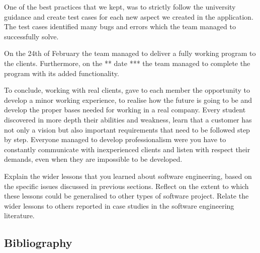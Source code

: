 \documentclass{l3proj}
\begin{document}
One of the best practices that we kept, was to strictly follow the university guidance and create test cases for each new aspect we created in the application. The test cases identified many bugs and errors which the team managed to successfully solve.


On the 24th of February the team managed to deliver a fully working program to the clients. Furthermore, on the ** date *** the team managed to complete the program with its added functionality.

To conclude, working with real clients, gave to each member the opportunity to develop a minor working experience, to realise how the future is going to be and develop the proper bases needed for working in a real company. Every student discovered in more depth their abilities and weakness, learn that a customer has not only a vision but also important requirements that need to be followed step by step. Everyone managed to develop professionalism were you have to constantly communicate with inexperienced clients and listen with respect their demands, even when they are impossible to be developed.









Explain the wider lessons that you learned about software engineering,
based on the specific issues discussed in previous sections.  Reflect
on the extent to which these lessons could be generalised to other
types of software project.  Relate the wider lessons to others
reported in case studies in the software engineering literature.



\subsection{Bibliography}
\label{Bibliography}
\end{document}
